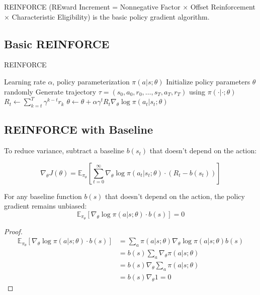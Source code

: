 REINFORCE (REward Increment = Nonnegative Factor × Offset Reinforcement × Characteristic Eligibility) is the basic policy gradient algorithm.

\subsection{Basic REINFORCE}

\begin{algorithm}
\caption{REINFORCE}
\begin{algorithmic}
\REQUIRE Learning rate $\alpha$, policy parameterization $\pi(a|s; \theta)$
\STATE Initialize policy parameters $\theta$ randomly
    \STATE Generate trajectory $\tau = (s_0, a_0, r_0, \ldots, s_T, a_T, r_T)$ using $\pi(\cdot|\cdot; \theta)$
        \STATE $R_t \leftarrow \sum_{k=t}^T \gamma^{k-t} r_k$ 
        \STATE $\theta \leftarrow \theta + \alpha \gamma^t R_t \nabla_\theta \log \pi(a_t|s_t; \theta)$ 
    \ENDFOR
\ENDFOR
\end{algorithmic}
\end{algorithm}

\subsection{REINFORCE with Baseline}

To reduce variance, subtract a baseline $b(s_t)$ that doesn't depend on the action:

\begin{equation}
\nabla_\theta J(\theta) = \mathbb{E}_{\pi_\theta} \left[ \sum_{t=0}^\infty \nabla_\theta \log \pi(a_t|s_t; \theta) \cdot (R_t - b(s_t)) \right]
\end{equation}

\begin{theorem}
For any baseline function $b(s)$ that doesn't depend on the action, the policy gradient remains unbiased:
\begin{equation}
\mathbb{E}_{\pi_\theta} \left[ \nabla_\theta \log \pi(a|s; \theta) \cdot b(s) \right] = 0
\end{equation}
\end{theorem}

\begin{proof}
\begin{align}
\mathbb{E}_{\pi_\theta} \left[ \nabla_\theta \log \pi(a|s; \theta) \cdot b(s) \right] &= \sum_a \pi(a|s; \theta) \nabla_\theta \log \pi(a|s; \theta) b(s) \\
&= b(s) \sum_a \nabla_\theta \pi(a|s; \theta) \\
&= b(s) \nabla_\theta \sum_a \pi(a|s; \theta) \\
&= b(s) \nabla_\theta 1 = 0
\end{align}
\end{proof}


